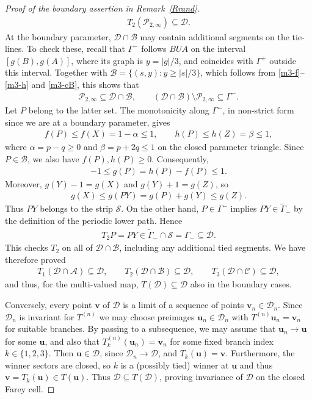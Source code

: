 \documentclass[11pt,reqno,tbtags,a4paper]{amsart}
\numberwithin{equation}{section}
\renewcommand\le{\leq}
\renewcommand\ge{\geq}
\renewcommand\leq{\leqslant}
\renewcommand\geq{\geqslant}
\theoremstyle{plain}%
\theoremstyle{definition}
\theoremstyle{remark}
\newcounter{cases}
\newcommand{\refR}[1]{Remark~\ref{#1}}
\newcommand\set[1]{\ensuremath{\{#1\}}}
\newcommand\gG{\Gamma}
\newcommand\cA{\mathcal A}
\newcommand\cB{\mathcal B}
\newcommand\cC{\mathcal C}
\newcommand\cD{\mathcal D}
\newcommand\cP{\mathcal P}
\newcommand\cS{{\mathcal S}}
\newcommand\vu{\mathbf{u}}
\newcommand\vv{\mathbf{v}}
\newcommand\tgG{\widetilde{\gG}}
\newcommand\Tn{T^{(n)}}
\newcommand\0{{\boldsymbol 0}}
\newcommand\1{{\boldsymbol 1}}
\begin{document}
\begin{proof}[Proof of the boundary assertion in \refR{Rrand}]
\begin{align}
T_2(\cP_{2,\infty})\subseteq\cD.
\end{align}
At the boundary parameter, $\cD\cap\cB$ may contain additional segments
on the tie-lines. To check these, recall that $\gG^-$ follows $BUA$ on
the interval $[g(B),g(A)]$, where its graph is $y=|g|/3$, and coincides
with $\gG^+$ outside this interval. Together with
$\cB=\{(s,y):y\ge|s|/3\}$, 
which follows from \eqref{m3-f}--\eqref{m3-h} and \eqref{m3-cB},
this shows that
\begin{align}
\cP_{2,\infty}\subseteq\cD\cap\cB,
\qquad
(\cD\cap\cB)\setminus\cP_{2,\infty}\subseteq\gG^-.
\end{align}
Let $P$ belong to the latter set.
The monotonicity along $\gG^-$, in non-strict form
since we are at a boundary parameter, gives
\begin{align}
f(P)\le f(X)=1-\alpha\le1,
\qquad
h(P)\le h(Z)=\beta\le1,
\end{align}
where $\alpha=p-q\ge0$ and $\beta=p+2q\le1$ on the closed parameter
triangle. Since $P\in\cB$, we also have $f(P),h(P)\ge0$.
Consequently,
\begin{align}
-1\le g(P)=h(P)-f(P)\le1.
\end{align}
Moreover, $g(Y)-1=g(X)$ and $g(Y)+1=g(Z)$, so
\begin{align}
g(X)\le g(PY)=g(P)+g(Y)\le g(Z).
\end{align}
Thus $PY$ belongs to the strip $\cS$.
On the other hand, $P\in\gG^-$ implies $PY\in\tgG_-$ by the definition
of the periodic lower path. Hence
\begin{align}
T_2P=PY\in\tgG_-\cap\cS=\gG_-\subseteq\cD.
\end{align}
This checks $T_2$ on all of $\cD\cap\cB$, including any additional
tied segments. We have therefore proved
\begin{align}\label{tyr}
T_1(\cD\cap\cA)\subseteq\cD,\qquad
T_2(\cD\cap\cB)\subseteq\cD,\qquad
T_3(\cD\cap\cC)\subseteq\cD,
\end{align}
and thus, for the multi-valued map, $T(\cD)\subseteq\cD$ also in the
boundary cases.


Conversely, every point $\vv$ of $\cD$ is a limit of a sequence of points
$\vv_n\in\cD_n$. Since $\cD_n$ is invariant for  $\Tn$
we may choose preimages $\vu_n\in \cD_n$ with $\Tn \vu_n=\vv_n$
for suitable branches.
By passing  to a  subsequence, we may assume that $\vu_n\to \vu$ for some
$\vu$, and also that $T_k^{(n)}(\vu_n)=\vv_n$ for some fixed 
branch index $k\in\set{1,2,3}$. 
Then $\vu\in\cD$, since $\cD_n\to\cD$, and $T_k(\vu)=\vv$.
Furthermore, the winner sectors are closed, 
so $k$ is a (possibly tied) winner at $\vu$ and thus
$\vv=T_k(\vu)\in T(\vu)$.
Thus $\cD\subseteq T(\cD)$, proving invariance of $\cD$ 
on the closed Farey cell.


\end{proof}
\end{document}
